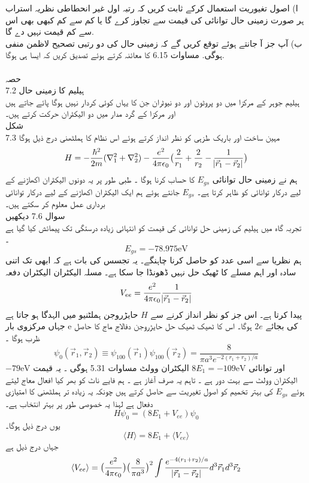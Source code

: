 \documentclass{book}
\begin{document}
ا) اصول تغيوریت استعمال کرکے ثابت کریں کہ رتبہ اول غير انحطاطی نظریہ استراب ہر صورت زمینی حال توانائی کی قیمت سے تجاوز کرے گا يا كم سے كم کبھی بھی اس سے كم قیمت نہیں دے گا.\\
ب) آپ جز آ جانتے ہوئے توقع کریں گے کہ زمینی حال کی دو رتبی تصحیح لاظمن منفی ہوگی. مساوات 6.15 کا معائنہ كرتے ہوئے تصدیق كريں کہ ایسا ہی ہوگا. \\
\\
حصہ \\7.2
ہیلیم کا زمینی حال\\ 
ہیلیم جوہر کے مرکزا میں دو پروٹون اور دو نیوٹران جن کا یہاں کوئی کردار نہیں ہوگا پائے جاتے ہیں اور مرکزا کے گرد مدار میں دو الیکٹران حرکت کرتے ہیں۔\\
شکل \\7.3
مہین ساخت اور باریک طزہی کو نظر انداز کرتے ہوئے اس نظام کا ہملٹھنی درج ذیل ہوگا 
\[H=-\frac{\hbar^{2}}{2m}(\nabla_{1}^{2}+\nabla_{2}^{2})-\frac{e^{2}}{4\pi\epsilon_{0}}\big (\frac{2}{r_{1}}+\frac{2}{r_{2}}-\frac{1}{\abs{\vec{r}_{1}-\vec{r}_{2}}}\big )\]
ہم نے زمینی حال توانائی 
 \(E_{gs}\)
  کا حساب کرنا ہوگا ۔ طبی طور پر یہ دونوں الیکٹران اکھاڑنے کے لیے درکار توانائی کو ظاہر کرتا ہے۔ 
 \(E_{gs}\)
   جانتے ہوئے ہم ایک الیکٹران اکھاڑنے کے لیے درکار توانائی برداری عمل معلوم کر سکتے ہیں۔\\
سوال 7.6 دیکھیں\\  
تجربہ گاہ میں ہیلیم کی زمینی حل توانائی کی قیمت کو انتہائی زیادہ درستگی تک پیمائش کیا گیا ہے ۔
\[E_{gs}=-78.975 \text{eV}\]
ہم نظریا سے اسی عدد کو حاصل کرنا چاہنگے۔ یہ تجسس کی بات ہے کہ ابھی تک اتنی سادہ اور اہم مسلے کا ٹھیک حل نہیں ڈھونڈا جا سکا ہے۔
مسلہ الیکٹران الیکٹران دفعہ 
\[V_{ee}=\frac{e^{2}}{4\pi\epsilon_{0}}\frac{1}{\abs{\vec{r}_{1}-\vec{r}_{2}}}\]
پیدا کرتا ہے۔ اس جز کو نظر انداز کرنے سے
 \(H \)
حایڑروجن ہملٹنیو میں الہدگا ہو جاتا ہے جہاں مرکزوی بار e کی بجائے
 \(2e\)
 ہوگا۔ اس کا ٹھیک ٹھیک حل حایڑروجن دفالاج ماج کا حاصل ظرب ہوگا ۔
\[\psi_{0}(\vec{r}_{1},\vec{r}_{2})\equiv \psi_{100}(\vec{r}_{1})\psi_{100}(\vec{r}_{2})=\frac{8}{\pi a^{3}e^{-2(r_{1}+r_{2})/a}}\]
اور توانائی
 \(8E_{1}=-109\text{eV}\)
 الیکٹران وولٹ  
مساوات 5.31 ہوگی ۔ یہ قیمت
 \(-79\text{eV}\) 
 الیکٹران وولٹ سے بہت دور ہے ۔ تاہم یہ صرف آغاز ہے ۔ ہم فایے ناٹ کو بھر کیا افعال معاج لیتے ہوئے  
 \(E_{gs}\)
  کی بہتر تخمیم کو اصول تغیریت سے حاصل کرتے ہیں چونکہ یہ زیادہ تر ہملٹھنی کا امتیازی  دفعال ہے لہذا یہ خصوصی طور پر بہتر انتخاب ہے۔
\[H\psi_{0}=(8E_{1}+V_{ee})\psi_{0}\]
یوں درج ذیل ہوگا۔ 
\[\langle H \rangle=8E_{1}+\langle V_{ee}\rangle\]
جہاں درج ذیل ہے 
\[\langle V_{ee}\rangle=\big(\frac{e^{2}}{4\pi\epsilon_{0}}\big )\big (\frac{8}{\pi a^{3}}\big )^{2}\int \frac{e^{-4(r_{1}+r_{2})/a}}{\abs{\vec{r}_{1}-\vec{r}_{2}}}d^{3}\vec{r}_{1}d^{3}\vec{r}_{2}\]
\end{document}
